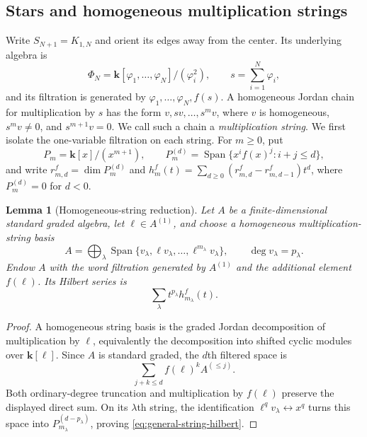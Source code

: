 \documentclass[reqno]{article}
\theoremstyle{plain} %
\newtheorem{lemma}[theorem]{Lemma}
\theoremstyle{definition}
\theoremstyle{remark}
\DeclareMathOperator{\Span}{Span}
\newcommand{\K} {\mathbf{k}}
\numberwithin{equation}{section}
\begin{document}
\subsection{Stars and homogeneous multiplication strings}
\label{sec:stars}

Write $S_{N+1}=K_{1,N}$ and orient its edges away from the center.
Its underlying algebra is
\[
 \Phi_N=\K[\varphi_1,\ldots,\varphi_N]/(\varphi_i^2),\qquad
 s=\sum_{i=1}^N\varphi_i,
\]
and its filtration is generated by $\varphi_1,\ldots,\varphi_N,f(s)$.
A homogeneous Jordan chain for multiplication by $s$ has the form
$v,sv,\ldots,s^m v$, where $v$ is homogeneous, $s^m v\ne0$, and
$s^{m+1}v=0$. We call such a chain a \emph{multiplication string}.
We first isolate the one-variable filtration on each string. For $m\ge0$, put
\begin{equation}\label{eq:scalar-star-filtration}
 P_m=\K[x]/(x^{m+1}),\qquad
 P_m^{(d)}=\Span\{x^if(x)^j:i+j\le d\},
\end{equation}
and write $r_{m,d}^f=\dim P_m^{(d)}$ and
$h_m^f(t)=\sum_{d\ge0}(r_{m,d}^f-r_{m,d-1}^f)t^d$,
where $P_m^{(d)}=0$ for $d<0$.

\begin{lemma}[Homogeneous-string reduction]
\label{lem:homogeneous-strings}
Let $A$ be a finite-dimensional standard graded algebra, let
$\ell\in A^{(1)}$, and choose a homogeneous multiplication-string
basis
\[
 A=\bigoplus_\lambda\Span\{v_\lambda,\ell v_\lambda,
                   \ldots,\ell^{m_\lambda}v_\lambda\},
 \qquad \deg v_\lambda=p_\lambda.
\]
Endow $A$ with the word filtration generated by $A^{(1)}$ and the
additional element $f(\ell)$. Its Hilbert series is
\begin{equation}\label{eq:general-string-hilbert}
 \sum_\lambda t^{p_\lambda}h_{m_\lambda}^f(t).
\end{equation}
\end{lemma}
\begin{proof}
A homogeneous string basis is the graded Jordan decomposition of
multiplication by $\ell$, equivalently the decomposition into shifted
cyclic modules over $\K[\ell]$. Since $A$ is standard graded, the $d$th
filtered space is
\[
 \sum_{j+k\le d} f(\ell)^k A^{(\le j)}.
\]
Both ordinary-degree truncation and multiplication by $f(\ell)$ preserve
the displayed direct sum. On its $\lambda$th string, the identification
$\ell^qv_\lambda\leftrightarrow x^q$ turns this space into
$P_{m_\lambda}^{(d-p_\lambda)}$, proving
\eqref{eq:general-string-hilbert}.
\end{proof}
\end{document}
